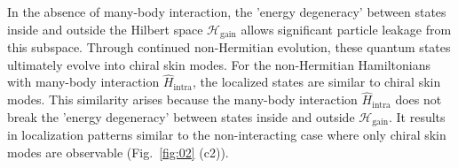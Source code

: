 \documentclass[longbibliography, aps, prx, amsmath, amssymb, amsfonts, twocolumn,superscriptaddress, footinbib]{revtex4-1}
\begin{document}
	In the absence of many-body interaction, the 'energy degeneracy' between states inside and outside the Hilbert space $\mathscr{H}_{\text{gain}}$ allows significant particle leakage from this subspace.
	Through continued non-Hermitian evolution, these quantum states ultimately evolve into chiral skin modes.
	For the non-Hermitian Hamiltonians with many-body interaction $\hat{H}_{\text{intra}}$, the localized states are similar to chiral skin modes. 
	This similarity arises because 
	the many-body interaction $\hat{H}_{\text{intra}}$ does not break 
	the 'energy degeneracy' between states inside and outside $\mathscr{H}_{\text{gain}}$. It results in localization patterns similar to the non-interacting case where only chiral skin modes are observable (Fig.~\ref{fig:02} (c2)).

\end{document}
